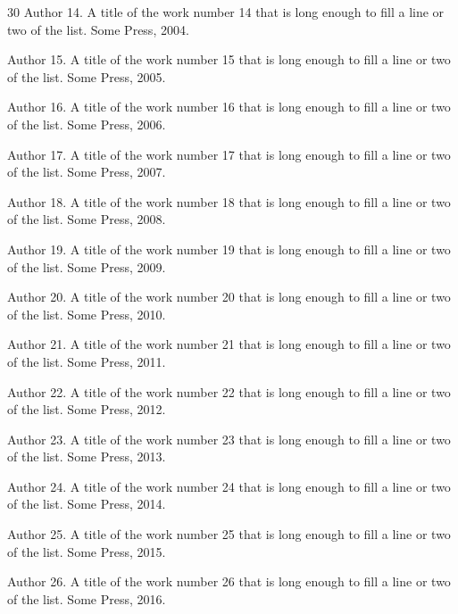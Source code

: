 \documentclass{report}
\begin{document}
\begin{thebibliography}{30}
Author 14.
\newblock A title of the work number 14 that is long enough to fill a line or two of the list.
\newblock Some Press, 2004.

Author 15.
\newblock A title of the work number 15 that is long enough to fill a line or two of the list.
\newblock Some Press, 2005.

Author 16.
\newblock A title of the work number 16 that is long enough to fill a line or two of the list.
\newblock Some Press, 2006.

Author 17.
\newblock A title of the work number 17 that is long enough to fill a line or two of the list.
\newblock Some Press, 2007.

Author 18.
\newblock A title of the work number 18 that is long enough to fill a line or two of the list.
\newblock Some Press, 2008.

Author 19.
\newblock A title of the work number 19 that is long enough to fill a line or two of the list.
\newblock Some Press, 2009.

Author 20.
\newblock A title of the work number 20 that is long enough to fill a line or two of the list.
\newblock Some Press, 2010.

Author 21.
\newblock A title of the work number 21 that is long enough to fill a line or two of the list.
\newblock Some Press, 2011.

Author 22.
\newblock A title of the work number 22 that is long enough to fill a line or two of the list.
\newblock Some Press, 2012.

Author 23.
\newblock A title of the work number 23 that is long enough to fill a line or two of the list.
\newblock Some Press, 2013.

Author 24.
\newblock A title of the work number 24 that is long enough to fill a line or two of the list.
\newblock Some Press, 2014.

Author 25.
\newblock A title of the work number 25 that is long enough to fill a line or two of the list.
\newblock Some Press, 2015.

Author 26.
\newblock A title of the work number 26 that is long enough to fill a line or two of the list.
\newblock Some Press, 2016.


\end{thebibliography}
\end{document}
